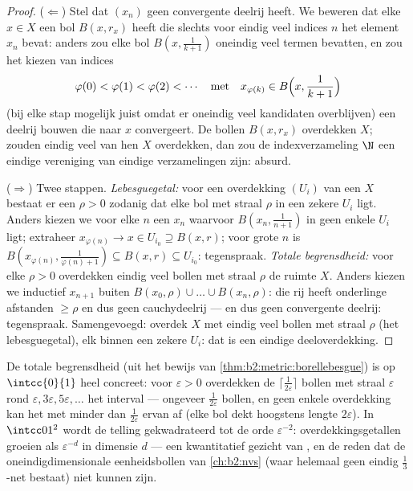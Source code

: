 \begin{proof}
($\Leftarrow$) Stel dat $(x_n)$ geen convergente deelrij heeft. We
beweren dat elke $x \in X$ een bol $B(x, r_x)$ heeft die slechts
voor eindig veel indices $n$ het element $x_n$ bevat: anders zou
elke bol $B(x, \frac1{k+1})$ oneindig veel termen bevatten, en zou
het kiezen van indices
\[
\varphi(0) < \varphi(1) < \varphi(2) < \cdots
\quad\text{met}\quad
x_{\varphi(k)} \in B\Bigl(x, \frac{1}{k+1}\Bigr)
\]
(bij elke stap mogelijk juist omdat er oneindig veel kandidaten
overblijven) een deelrij bouwen die naar $x$ convergeert. De bollen
$B(x, r_x)$ overdekken $X$; zouden eindig veel van hen $X$
overdekken, dan zou de indexverzameling $\N$ een eindige vereniging
van eindige verzamelingen zijn: absurd.

($\Rightarrow$) Twee stappen. \emph{Lebesguegetal:} voor een 
overdekking $(U_i)$ van een  $X$ bestaat er een $\rho > 0$
zodanig dat elke bol met straal $\rho$ in een zekere $U_i$ ligt.
Anders kiezen we voor elke $n$ een $x_n$ waarvoor $B(x_n,
\frac{1}{n+1})$ in geen enkele $U_i$ ligt; extraheer
$x_{\varphi(n)} \to x \in U_{i_0} \supseteq B(x, r)$; voor grote
$n$ is $B(x_{\varphi(n)}, \frac{1}{\varphi(n)+1}) \subseteq B(x, r)
\subseteq U_{i_0}$: tegenspraak. \emph{Totale begrensdheid:} voor
elke $\rho > 0$ overdekken eindig veel bollen met straal $\rho$ de
ruimte $X$. Anders kiezen we inductief $x_{n+1}$ buiten $B(x_0,
\rho) \cup \dots \cup B(x_n, \rho)$: die rij heeft onderlinge
afstanden $\geq \rho$ en dus geen cauchydeelrij --- en dus geen
convergente deelrij: tegenspraak. Samengevoegd: overdek $X$ met
eindig veel bollen met straal $\rho$ (het lebesguegetal), elk
binnen een zekere $U_i$: dat is een eindige deeloverdekking.
\end{proof}

\begin{example}\label{ex:b2:metric:epsnet}
De totale begrensdheid (uit het bewijs van
\cref{thm:b2:metric:borellebesgue}) is op $\intcc{0}{1}$ heel
concreet: voor $\varepsilon > 0$ overdekken de $\lceil
\frac{1}{2\varepsilon}\rceil$ bollen met straal $\varepsilon$ rond
$\varepsilon, 3\varepsilon, 5\varepsilon, \dots$ het interval ---
ongeveer $\frac1{2\varepsilon}$ bollen, en geen enkele overdekking
kan het met minder dan $\frac{1}{2\varepsilon}$ ervan af (elke bol
dekt hoogstens lengte $2\varepsilon$). In $\intcc01^2$ wordt de
telling gekwadrateerd tot de orde $\varepsilon^{-2}$:
overdekkingsgetallen groeien als $\varepsilon^{-d}$ in dimensie
$d$ --- een kwantitatief gezicht van , en de reden dat
de oneindigdimensionale eenheidsbollen van \cref{ch:b2:nvs} (waar
helemaal geen eindig $\frac13$-net bestaat) niet  kunnen
zijn.
\end{example}


